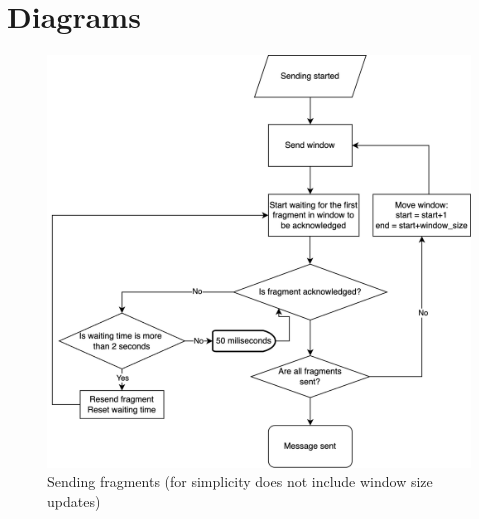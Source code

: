 \documentclass{article}
\begin{document}
\section{Diagrams}
\begin{figure}[!h]
    \centering
    \includegraphics[width=\textwidth]{images/sendingp.png}
    \caption{Sending fragments (for simplicity does not include window size updates)}
    \label{fig:mesh1}
\end{figure}
\end{document}
